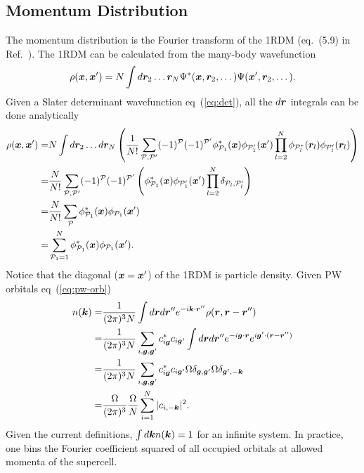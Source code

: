 \subsection{Momentum Distribution}
\label{sec:wf-pw-sdet-nk}
The momentum distribution is the Fourier transform of the 1RDM (eq.~(5.9) in Ref.~\cite{Martin2016}). The 1RDM can be calculated from the many-body wavefunction
\begin{align}
\rho(\boldsymbol{x}, \boldsymbol{x}') = N\int d\boldsymbol{r}_2\dots\boldsymbol{r}_N \Psi^*(\boldsymbol{x}, \boldsymbol{r}_2, \dots) \Psi(\boldsymbol{x}', \boldsymbol{r}_2, \dots).
\end{align}
Given a Slater determinant wavefunction eq~(\ref{eq:det}), all the $d\boldsymbol{r}$ integrals can be done analytically
\begin{align}
\rho(\boldsymbol{x}, \boldsymbol{x}') =& N\int d\boldsymbol{r}_2\dots d\boldsymbol{r}_N
\left(
\frac{1}{N!}\sum\limits_{\mathcal{P}, \mathcal{P}'} (-1)^{\mathcal{P}} (-1)^{\mathcal{P}'}
\phi_{\mathcal{P}_1}^*(\boldsymbol{x})\phi_{\mathcal{P}_1'}(\boldsymbol{x}')
\prod\limits_{l=2}^{N}\phi_{\mathcal{P}_l^*}(\boldsymbol{r}_l)\phi_{\mathcal{P}_l'}(\boldsymbol{r}_l) 
\right) \nonumber \\
=& \frac{N}{N!} \sum\limits_{\mathcal{P}, \mathcal{P}'} (-1)^{\mathcal{P}} (-1)^{\mathcal{P}'}
\left(
\phi_{\mathcal{P}_1}^*(\boldsymbol{x})\phi_{\mathcal{P}_1'}(\boldsymbol{x}')
\prod\limits_{l=2}^N \delta_{\mathcal{P}_l,\mathcal{P}_l'}
\right) \nonumber \\
=& \frac{N}{N!} \sum\limits_{\mathcal{P}} \phi_{\mathcal{P}_1}^*(\boldsymbol{x})\phi_{\mathcal{P}_1}(\boldsymbol{x}') \nonumber \\
=& \sum\limits_{\mathcal{P}_1=1}^N \phi_{\mathcal{P}_1}^*(\boldsymbol{x})\phi_{\mathcal{P}_1}(\boldsymbol{x}'). \label{eq:det-1rdm}
\end{align}
Notice that the diagonal ($\boldsymbol{x}=\boldsymbol{x}'$) of the 1RDM is particle density. Given PW orbitals eq~(\ref{eq:pw-orb})
\begin{align}
n(\boldsymbol{k}) =& \frac{1}{(2\pi)^3N}\int d\boldsymbol{r} d\boldsymbol{r}'' e^{-i\boldsymbol{k}\cdot\boldsymbol{r}''} \rho(\boldsymbol{r}, \boldsymbol{r}-\boldsymbol{r}'') \nonumber \\
= & \frac{1}{(2\pi)^3N} \sum\limits_{i, \boldsymbol{g}, \boldsymbol{g}'} c_{i\boldsymbol{g}}^*c_{i\boldsymbol{g}'}
\int d\boldsymbol{r} d\boldsymbol{r}'' e^{-i\boldsymbol{g}\cdot\boldsymbol{r}}e^{i\boldsymbol{g}'\cdot(\boldsymbol{r}-\boldsymbol{r}'')} \nonumber \\
=&  \frac{1}{(2\pi)^3N} \sum\limits_{i, \boldsymbol{g}, \boldsymbol{g}'} c_{i\boldsymbol{g}}^*c_{i\boldsymbol{g}'} \Omega\delta_{\boldsymbol{g}, \boldsymbol{g}'}\Omega\delta_{\boldsymbol{g}',-\boldsymbol{k}} \nonumber \\
=& \frac{\Omega}{(2\pi)^3}\frac{\Omega}{N}\sum_{i=1}^{N} \vert c_{i,-\boldsymbol{k}}\vert^2.\label{eq:det-nofk}
\end{align}
Given the current definitions, $\int d\boldsymbol{k} n(\boldsymbol{k}) = 1$ for an infinite system. In practice, one bins the Fourier coefficient squared of all occupied orbitals at allowed momenta of the supercell.

